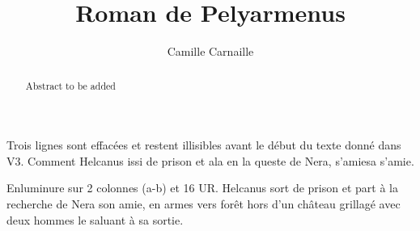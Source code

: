 \documentclass{article}
\begin{document}
\date{}
        \title{Roman de Pelyarmenus}
        \author{Camille Carnaille}
\maketitle

\begin{abstract}
Abstract to be added
\end{abstract}
\begin{pages}
\beginnumbering
        
   
  
      
         Trois lignes sont effacées et restent illisibles avant le début du texte donné dans V3. 
          Comment Helcanus issi de prison et ala en la queste
         de Nera, 
            s'amiesa s'amie.
            
               Enluminure sur 2 colonnes (a-b) et 16 UR. 
                  Helcanus sort de prison et 
                  part à la recherche de Nera son amie, 
                  en armes vers forêt hors d’un château grillagé avec deux hommes le saluant à sa sortie.
            

\end{pages}
\end{document}
